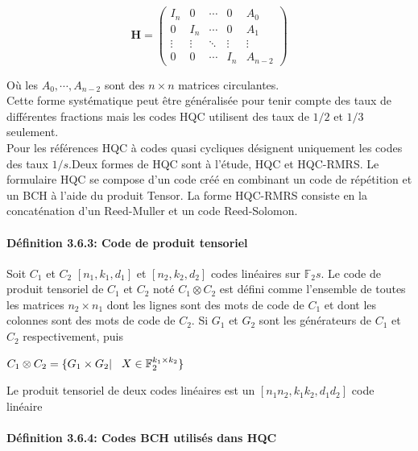 \documentclass[12pt,openany]{report}
\begin{document}
\begin{center}
 $$ \mathbf{H}=  \begin{pmatrix}
I_n & 0 & \cdots & 0 & A_0 \\
0 & I_n & \cdots & 0&  A_1 \\
\vdots & \vdots & \ddots & \vdots & \vdots\\
0 & 0 & \cdots & I_n & A_{n-2}
\end{pmatrix}$$
 \end{center}
 Où les $ A_0,\cdots,A_{n-2}$ sont des $ n \times n  $ matrices circulantes.\\
 
 Cette forme systématique peut être généralisée pour tenir compte des taux de différentes fractions
mais les codes HQC utilisent des taux de $1/2$ et $1/3$ seulement.\\ Pour les références HQC à
codes quasi cycliques désignent uniquement les codes des taux $1/s$.Deux formes de HQC sont à l’étude, HQC et HQC-RMRS. Le formulaire HQC se compose d’un code créé en combinant un code de répétition et un BCH
à l’aide du produit Tensor. La forme HQC-RMRS consiste en la concaténation d’un
Reed-Muller et un code Reed-Solomon.
\paragraph{Définition 3.6.3: Code de produit tensoriel }\cite{melchor2020}

Soit $C_1$ et $C_2$ $[n_1, k_1, d_1]$ et $[n_2, k_2, d_2]$ codes linéaires sur $\mathbb{F}_2s$. Le code de produit tensoriel de $C_1$ et $C_2$ noté
$C_1\otimes  C_2$ est défini comme l’ensemble de toutes les matrices $n_2 \times n_1$ dont les lignes sont des mots de code de $C_1$
et dont les colonnes sont des mots de code de $C_2$. Si $G_1$ et $G_2$ sont les générateurs de $C_1$ et
$C_2$ respectivement, puis
\begin{center}

$  C_1 \otimes C_2 = \lbrace G_1 \times G_2 |\hspace{0.3cm} X \in \mathbb{F}_2^{k_1 \times k_2} \rbrace $
\end{center}

Le produit tensoriel de deux codes linéaires est un  $[n_1n_2, k_1k_2, d_1d_2]$ code linéaire
\paragraph{Définition 3.6.4: Codes BCH utilisés dans HQC \\}
\end{document}
